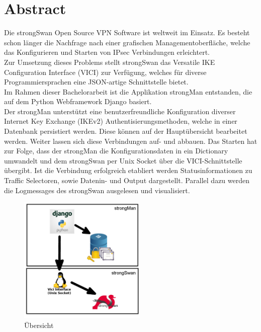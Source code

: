 \section{Abstract}
Die strongSwan Open Source VPN Software ist weltweit im Einsatz. Es besteht schon länger die Nachfrage nach einer grafischen Managementoberfläche, welche das Konfigurieren und Starten von IPsec Verbindungen erleichtert.\\
Zur Umsetzung dieses Problems stellt strongSwan das Versatile IKE Configuration Interface (VICI) zur Verfügung, welches für diverse Programmiersprachen eine JSON-artige Schnittstelle bietet. \\
Im Rahmen dieser Bachelorarbeit ist die Applikation strongMan entstanden, die auf dem Python Webframework Django basiert.\\

Der strongMan unterstützt eine benutzerfreundliche Konfiguration diverser Internet Key Exchange (IKEv2) Authentisierungsmethoden, welche in einer Datenbank persistiert werden. Diese können auf der Hauptübersicht bearbeitet werden. Weiter lassen sich diese Verbindungen auf- und abbauen. Das Starten hat zur Folge, dass der strongMan die Konfigurationsdaten in ein Dictionary umwandelt und dem strongSwan per Unix Socket über die VICI-Schnittstelle übergibt. Ist die Verbindung erfolgreich etabliert werden Statusinformationen zu Traffic Selectoren, sowie Datenin- und Output dargestellt. Parallel dazu werden die Logmessages des strongSwan ausgelesen und visualisiert.\\

\begin{figure}
  \begin{center}
    \includegraphics[width=230px]{images/strongman_ubersicht.jpg}
  \end{center}
    \caption[Übersicht]{Übersicht}
\end{figure}

